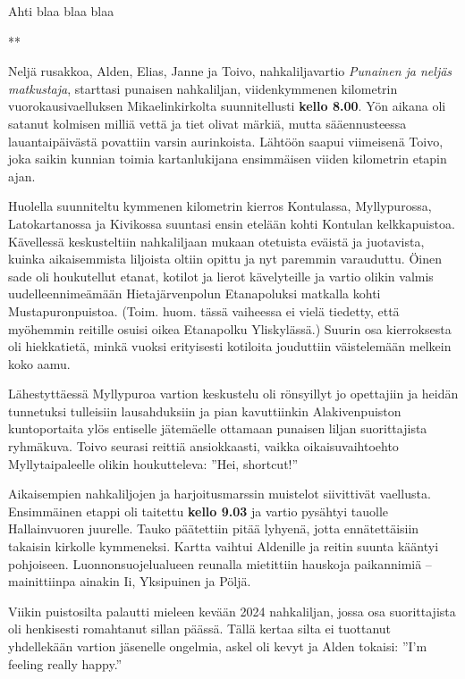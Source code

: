 \begin{multicols}{2}
\noindent Ahti blaa blaa blaa

{\smallskip\noindent\centering ***\par\smallskip}

Neljä rusakkoa, Alden, Elias, Janne ja Toivo, nahkaliljavartio 
\textit{Punainen ja neljäs matkustaja}, starttasi punaisen nahkaliljan, 
viidenkymmenen kilometrin vuorokausivaelluksen Mikaelinkirkolta suunnitellusti 
\textbf{kello 8.00}. Yön aikana oli satanut kolmisen milliä vettä ja tiet 
olivat märkiä, mutta sääennusteessa lauantaipäivästä povattiin varsin 
aurinkoista. Lähtöön saapui viimeisenä Toivo, joka saikin kunnian toimia 
kartanlukijana ensimmäisen viiden kilometrin etapin ajan.

Huolella suunniteltu kymmenen kilometrin kierros Kontulassa, Myllypurossa, 
Latokartanossa ja Kivikossa suuntasi ensin etelään kohti Kontulan 
kelkkapuistoa. Kävellessä keskusteltiin nahkaliljaan mukaan otetuista 
eväistä ja juotavista, kuinka aikaisemmista liljoista oltiin opittu ja nyt 
paremmin varauduttu. Öinen sade oli houkutellut etanat, kotilot ja lierot 
kävelyteille ja vartio olikin valmis uudelleennimeämään Hietajärvenpolun 
Etanapoluksi matkalla kohti Mustapuronpuistoa. (Toim. huom. tässä vaiheessa 
ei vielä tiedetty, että myöhemmin reitille osuisi oikea Etanapolku 
Yliskylässä.) Suurin osa kierroksesta oli hiekkatietä, minkä vuoksi 
erityisesti kotiloita jouduttiin väistelemään melkein koko aamu. 

\thispagestyle{empty}

Lähestyttäessä Myllypuroa vartion keskustelu oli rönsyillyt jo opettajiin 
ja heidän tunnetuksi tulleisiin lausahduksiin ja pian kavuttiinkin 
Alakivenpuiston kuntoportaita ylös entiselle jätemäelle ottamaan punaisen 
liljan suorittajista ryhmäkuva. Toivo seurasi reittiä ansiokkaasti, vaikka 
oikaisuvaihtoehto Myllytaipaleelle olikin houkutteleva: ''Hei, shortcut!''

Aikaisempien nahkaliljojen ja harjoitusmarssin muistelot siivittivät 
vaellusta. Ensimmäinen etappi oli taitettu \textbf{kello 9.03} ja vartio 
pysähtyi tauolle Hallainvuoren juurelle. Tauko päätettiin pitää lyhyenä, 
jotta ennätettäisiin takaisin kirkolle kymmeneksi. Kartta vaihtui Aldenille 
ja reitin suunta kääntyi pohjoiseen. Luonnonsuojelualueen reunalla mietittiin 
hauskoja paikannimiä -- mainittiinpa ainakin Ii, Yksipuinen ja Pöljä. 

Viikin puistosilta palautti mieleen kevään 2024 nahkaliljan, jossa osa 
suorittajista oli henkisesti romahtanut sillan päässä. Tällä kertaa silta 
ei tuottanut yhdellekään vartion jäsenelle ongelmia, askel oli kevyt ja 
Alden tokaisi: ''I'm feeling really happy.''


\end{multicols}
